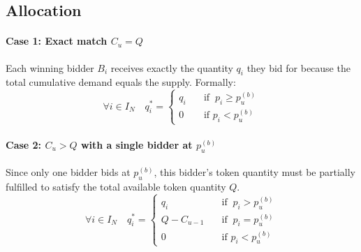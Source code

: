 
\subsection{Allocation}

\paragraph{Case 1: Exact match $C_u = Q$}
Each winning bidder $B_i$ receives exactly the quantity $q_i$ they bid for because the total cumulative demand equals the supply. Formally:
\begin{equation*}
    \forall i \in I_N \quad q_i^{*} = 
\begin{cases}
q_i \quad &\text{if } \ p_i \ge p_{u}^{(b)} \\
0 \quad &\text{if } p_i < p_{u}^{(b)}
\end{cases}
\end{equation*}

\paragraph{Case 2: $C_u > Q$ with a single bidder at $p_{u}^{(b)}$}
Since only one bidder bids at $p_{u}^{(b)}$, this bidder's token quantity must be partially fulfilled to satisfy the total available token quantity $Q$.
\begin{equation*}
    \forall i \in I_N \quad q_i^{*} = 
\begin{cases}
q_i \quad &\text{if } \ p_i > p_{u}^{(b)} \\
Q - C_{u-1} \quad &\text{if } \ p_i = p_{u}^{(b)} \\
0 \quad &\text{if } p_i < p_{u}^{(b)}
\end{cases}
\end{equation*}

